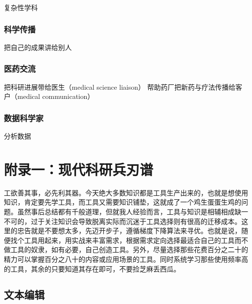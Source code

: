 \documentclass[]{tufte-book}
\begin{document}
复杂性学科

\hypertarget{ux79d1ux5b66ux4f20ux64ad}{%
\subsection{科学传播}\label{ux79d1ux5b66ux4f20ux64ad}}

把自己的成果讲给别人

\hypertarget{ux533bux836fux4ea4ux6d41}{%
\subsection{医药交流}\label{ux533bux836fux4ea4ux6d41}}

把科研进展带给医生（medical science liaison）
帮助药厂把新药与疗法传播给客户（medical communication）

\hypertarget{ux6570ux636eux79d1ux5b66ux5bb6}{%
\subsection{数据科学家}\label{ux6570ux636eux79d1ux5b66ux5bb6}}

分析数据

\hypertarget{tool}{%
\chapter*{附录一：现代科研兵刃谱}\label{tool}}

工欲善其事，必先利其器。今天绝大多数知识都是工具生产出来的，也就是想使用知识，肯定要先学工具，而工具又需要知识铺垫，这就成了一个鸡生蛋蛋生鸡的问题。虽然事后总结都有千般道理，但就我人经验而言，工具与知识是相辅相成缺一不可的，过于关注知识会导致脱离实际而沉迷于工具选择则有很高的迁移成本。这里的忠告就是不要想太多，先迈开步子，遵循梯度下降算法来寻优。也就是说，随便找个工具用起来，用实战来丰富需求，根据需求定向选择最适合自己的工具而不做工具的奴隶，如有必要，自己创造工具。另外，尽量选择那些花费百分之二十的精力可以掌握百分之八十的内容或应用场景的工具。同时系统学习那些使用频率高的工具，其余的只要知道其存在即可，不要捡芝麻丢西瓜。

\hypertarget{ux6587ux672cux7f16ux8f91}{%
\section*{文本编辑}\label{ux6587ux672cux7f16ux8f91}}
\end{document}

